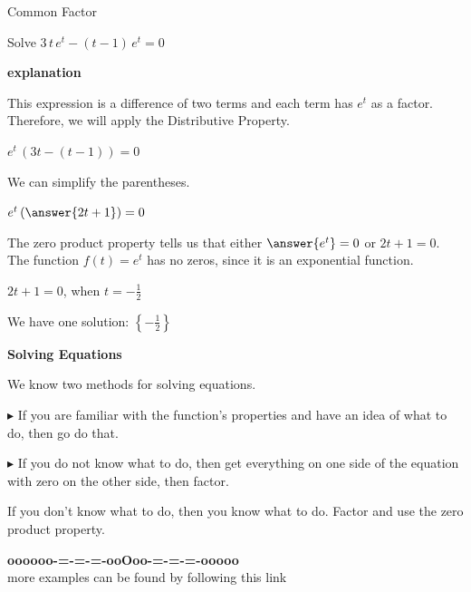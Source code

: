 \documentclass{ximera}
\begin{document}
\begin{example} Common Factor


Solve $3 \, t \, e^t - (t-1) \, e^t = 0$

\textbf{\textcolor{red!75!green}{explanation}} 



This expression is a difference of two terms and each term has $e^t$ as a factor.  Therefore, we will apply the Distributive Property.



$e^t \, (3t - (t-1))= 0$


We can simplify the parentheses.



$e^t \left( \answer{2t + 1} \right)= 0$



The zero product property tells us that either $\answer{e^t} = 0$ or $2t + 1 = 0$.  \\

The function $f(t) = e^t$ has no zeros, since it is an exponential function.


$2t + 1 = 0$, when $t = -\frac{1}{2}$

We have one solution: $\left\{ -\frac{1}{2} \right\}$


\end{example}







\begin{procedure} \textbf{\textcolor{purple!30!blue}{Solving Equations}}


We know two methods for solving equations.


\textbf{\textcolor{blue!55!black}{$\blacktriangleright$}} If you are familiar with the function's properties and have an idea of what to do, then go do that. 


\textbf{\textcolor{blue!55!black}{$\blacktriangleright$}} If you do not know what to do, then get everything on one side of the equation with zero on the other side, then factor. 



If you don't know what to do, then you know what to do.  Factor and use the zero product property.


\end{procedure}







\begin{center}
\textbf{\textcolor{green!50!black}{oooooo-=-=-=-ooOoo-=-=-=-ooooo}} \\

more examples can be found by following this link\\ 

\end{center}
\end{document}
